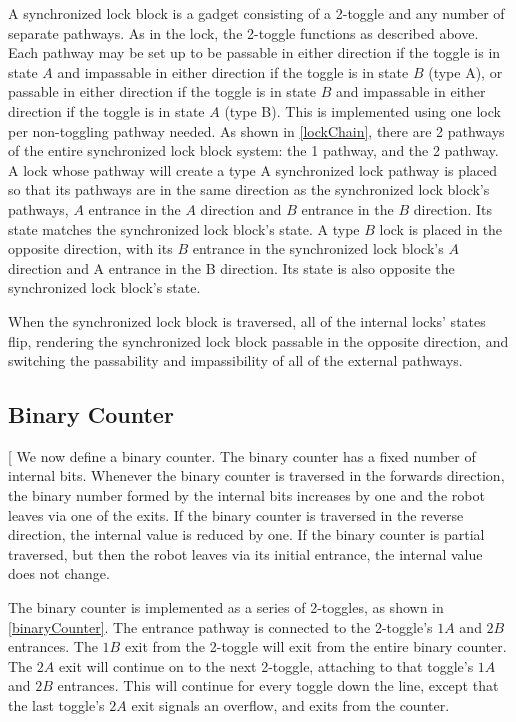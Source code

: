 \documentclass[11pt]{article}
\makeatletter
\gdef\xxx{\@ifnextchar[\xxx@lab\xxx@nolab}
\makeatother
\begin{document}
A synchronized lock block is a gadget consisting of a 2-toggle and any number of separate pathways. As in the
lock, the 2-toggle functions as described above. Each pathway may be set up to be passable in either direction
if the toggle is in state $A$ and impassable in either direction if the toggle is in state $B$ (type A), or
passable in either direction if the toggle is in state $B$ and impassable in either direction if the
toggle is in state $A$ (type B). This is
implemented using one lock per non-toggling pathway needed. As shown in \ref{lockChain}, there are 2
pathways of the entire synchronized lock block system: the 1 pathway, and the 2 pathway. A lock whose pathway will create
a type A synchronized lock pathway is placed so that its pathways are in the same direction as the synchronized lock block's
pathways, $A$ entrance in the $A$ direction and $B$ entrance in the $B$ direction. Its state matches the 
synchronized lock block's
state.
A type $B$ lock is placed in the opposite direction, with its $B$ entrance in the synchronized lock block's $A$ direction and
A entrance in the B direction. Its state is also opposite the synchronized lock block's state.

When the synchronized lock block is traversed, all of the internal locks' states flip, rendering the synchronized lock block passable in
the opposite direction, and switching the passability and impassibility of all of the external pathways.

\subsection{Binary Counter}
\xxx{binary counter figure}
We now define a binary counter. The binary counter has a fixed number of internal bits.
Whenever the binary counter is traversed in the forwards direction, the binary number
formed by the internal bits increases by one and the robot leaves via one of the exits.
If the binary counter is traversed in the reverse direction, the internal value is reduced by
one. If the binary counter is partial traversed, but then the robot leaves via its initial entrance,
the internal value does not change.

The binary counter is implemented as a series of 2-toggles, as shown in \ref{binaryCounter}.
The entrance pathway is connected to the 2-toggle's $1A$ and $2B$ entrances. The $1B$ exit from the 2-toggle
will exit from the entire binary counter. The $2A$ exit will continue on to the next 2-toggle,
attaching to that toggle's $1A$ and $2B$ entrances. This will continue for every toggle down the line, except
that the last toggle's $2A$ exit signals an overflow, and exits from the counter.
\end{document}
